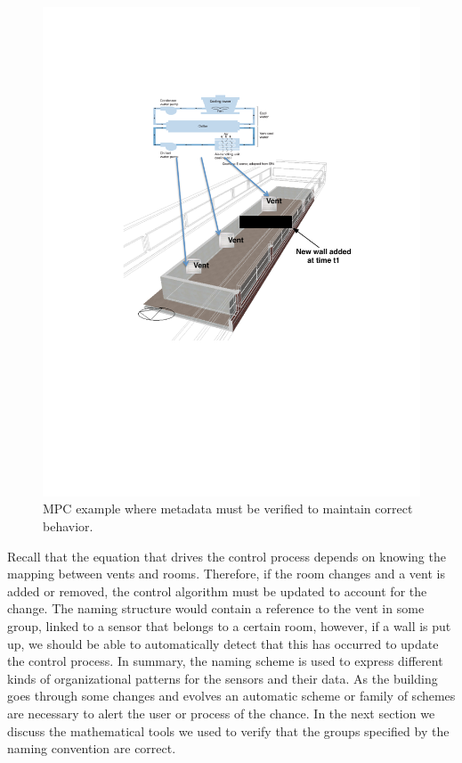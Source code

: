 \begin{figure}[h!] %
\centering
\includegraphics[width=0.5\columnwidth]{figs/mpc_example}
\caption{MPC example where metadata must be verified to maintain correct behavior.}
\label{fig:mpc_example2}
\end{figure}

Recall that the equation that drives the control process depends on knowing the mapping between vents and rooms.  Therefore,
if the room changes and a vent is added or removed, the control algorithm must be updated to account for the change.  The naming
structure would contain a reference to the vent in some group, linked to a sensor that belongs to a certain room, however,
if a wall is put up, we should be able to automatically detect that this has occurred to update the control process.
In summary, the naming scheme is used to express different kinds of organizational patterns for the sensors and their data.
As the building goes through some changes and evolves an automatic scheme or family of schemes are necessary to alert
the user or process of the chance.  In the next
section we discuss the mathematical tools we used to verify that the groups specified by the naming convention are correct.
